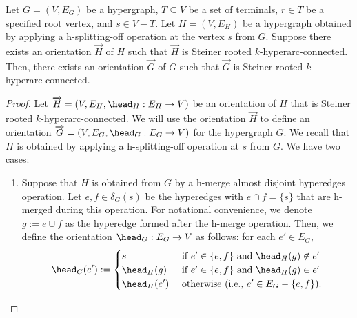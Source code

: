 \begin{lemma}\label{lem:lifting-Steiner-orientation-through-splitting-off}
    Let $G=(V, E_G)$ be a hypergraph, $T\subseteq V$ be a set of terminals, $r\in T$ be a specified root vertex, and $s\in V-T$. 
    Let $H = (V, E_H)$ be a hypergraph obtained by applying a h-splitting-off operation at the vertex $s$ from $G$. 
    Suppose there exists an orientation $\overrightarrow{H}$  
    of $H$ such that $\overrightarrow{H}$ is Steiner rooted $k$-hyperarc-connected. 
    Then, there exists an orientation 
    $\overrightarrow{G}$ 
    of $G$ such that $\overrightarrow{G}$ is Steiner rooted $k$-hyperarc-connected. 
\end{lemma}
\begin{proof}
 Let $\overrightarrow{H}= (V, E_H, \head_H:E_H\rightarrow V)$ be an orientation of $H$ that is Steiner rooted $k$-hyperarc-connected.  
  We will use the orientation $\overrightarrow{H}$ to define an orientation $\overrightarrow{G}=(V, E_G, \head_G: E_G\rightarrow V)$ for the hypergraph $G$. 
  We recall that $H$ is obtained by applying a h-splitting-off operation at $s$ from $G$. We have two cases: 
\begin{enumerate}
    \item Suppose that $H$ is obtained 
    from $G$ by a h-merge almost disjoint hyperedges operation. Let $e, f \in \delta_{G}(s)$ be the hyperedges with $e\cap f = \{s\}$ that are h-merged during this operation. For notational convenience, we denote $g:= e\cup f$ as the hyperedge formed after the h-merge operation. Then, we define the orientation $\head_{G}:E_G\rightarrow V$ as follows: for each $e' \in E_G$,
$$\head_{G}(e') := \begin{cases}
    s& \text{ if } e' \in \{e, f\} \text{ and } \head_{H}(g) \not \in e'\\
    
    \head_{H}(g) &\text{ if } e' \in \{e, f\} \text{ and } \head_{H}(g) \in e'\\
    
    \head_{H}(e')& \text{ otherwise (i.e., $e'\in E_G-\{e, f\}$).}
\end{cases}$$


\end{enumerate}
\end{proof}
